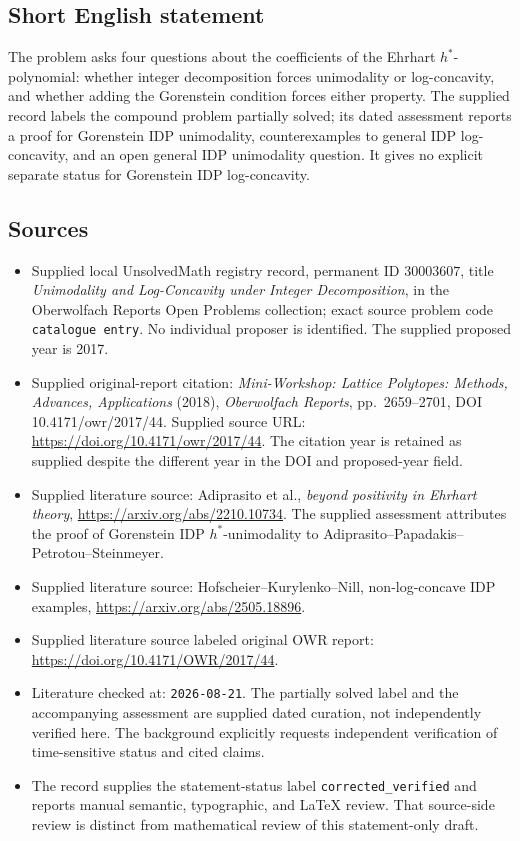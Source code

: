 \documentclass[11pt]{article}
\begin{document}
\subsection{Short English statement}
The problem asks four questions about the coefficients of the Ehrhart \(h^*\)-polynomial: whether integer decomposition forces unimodality or log-concavity, and whether adding the Gorenstein condition forces either property. The supplied record labels the compound problem partially solved; its dated assessment reports a proof for Gorenstein IDP unimodality, counterexamples to general IDP log-concavity, and an open general IDP unimodality question. It gives no explicit separate status for Gorenstein IDP log-concavity.
\subsection{Sources}
\begin{itemize}
\item Supplied local UnsolvedMath registry record, permanent ID \(30003607\), title \emph{Unimodality and Log-Concavity under Integer Decomposition}, in the Oberwolfach Reports Open Problems collection; exact source problem code \texttt{catalogue entry}. No individual proposer is identified. The supplied proposed year is 2017.
\item Supplied original-report citation: \emph{Mini-Workshop: Lattice Polytopes: Methods, Advances, Applications} (2018), \emph{Oberwolfach Reports}, pp.\ 2659--2701, DOI 10.4171/owr/2017/44. Supplied source URL: \url{https://doi.org/10.4171/owr/2017/44}. The citation year is retained as supplied despite the different year in the DOI and proposed-year field.
\item Supplied literature source: Adiprasito et al., \emph{beyond positivity in Ehrhart theory}, \url{https://arxiv.org/abs/2210.10734}. The supplied assessment attributes the proof of Gorenstein IDP \(h^*\)-unimodality to Adiprasito--Papadakis--Petrotou--Steinmeyer.
\item Supplied literature source: Hofscheier--Kurylenko--Nill, non-log-concave IDP examples, \url{https://arxiv.org/abs/2505.18896}.
\item Supplied literature source labeled original OWR report: \url{https://doi.org/10.4171/OWR/2017/44}.
\item Literature checked at: \texttt{2026-08-21}. The partially solved label and the accompanying assessment are supplied dated curation, not independently verified here. The background explicitly requests independent verification of time-sensitive status and cited claims.
\item The record supplies the statement-status label \texttt{corrected\_verified} and reports manual semantic, typographic, and LaTeX review. That source-side review is distinct from mathematical review of this statement-only draft.
\end{itemize}
\end{document}
